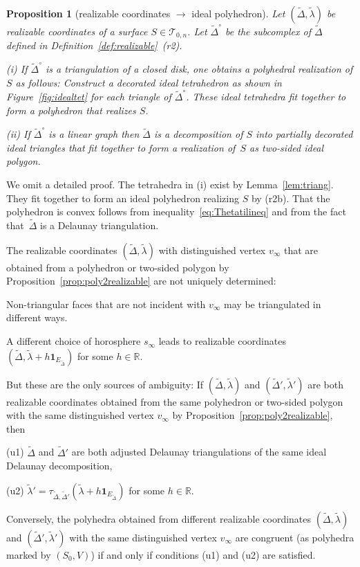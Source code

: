 \documentclass[a4paper, 11pt]{article}
\newcommand{\R}{\mathbb{R}}
\newcommand{\Teich}{\mathcal{T}}
\newcommand{\Deltil}{\widetilde{\Delta}}
\newcommand{\Deltilo}{\Deltil^{\circ}}
\newcommand{\lamtil}{\tilde{\lambda}}
\theoremstyle{plain}
\newtheorem{proposition}[theorem]{Proposition}
\theoremstyle{definition}
\begin{document}
\begin{proposition}[realizable coordinates $\rightarrow$ ideal polyhedron]
  \label{prop:realizable2poly}
  Let $(\Deltil,\lamtil)$ be realizable coordinates of a surface
  $S\in\Teich_{0,n}$. Let $\Deltilo$ be the subcomplex of $\Deltil$
  defined in Definition~\ref{def:realizable}~(r2).
  
  (i) If $\Deltilo$ is a triangulation of a closed disk, one obtains a
  polyhedral realization of $S$ as follows: Construct a decorated
  ideal tetrahedron as shown in Figure~\ref{fig:idealtet} for each
  triangle of $\Deltilo$. These ideal tetrahedra fit
  together to form a polyhedron that realizes $S$.

  (ii) If $\Deltilo$ is a linear graph then $\Deltil$ is a
  decomposition of $S$ into partially decorated ideal triangles that
  fit together to form a realization of~$S$ as two-sided ideal
  polygon.
\end{proposition}

We omit a detailed proof. The tetrahedra in (i) exist by
Lemma~\ref{lem:triang}. They fit together to form an ideal polyhedron
realizing $S$ by (r2b). That the polyhedron is convex follows from
inequality~\eqref{eq:Thetatilineq} and from the fact that~$\Deltil$ is
a Delaunay triangulation.

The realizable coordinates $(\Deltil,\lamtil)$ with distinguished
vertex $v_{\infty}$ that are obtained from a polyhedron or two-sided
polygon by Proposition~\ref{prop:poly2realizable} are not uniquely
determined:
\begin{compactitem}
\item Non-triangular faces that are not incident with
  $v_{\infty}$ may be triangulated in different ways. 
\item A different choice of horosphere $s_{\infty}$ leads to
  realizable coordinates
  $(\Deltil,\lamtil+h\mathbf{1}_{E_{\Deltil}})$ for some $h\in\R$.
\end{compactitem}
But these are the only sources of ambiguity: If $(\Deltil,\lamtil)$
and $(\Deltil',\lamtil')$ are both realizable coordinates obtained
from the same polyhedron or two-sided polygon with the same
distinguished vertex $v_{\infty}$ by
Proposition~\ref{prop:poly2realizable}, then
\begin{compactitem}[(u2)]
\item[(u1)] $\Deltil$ and $\Deltil'$ are both adjusted Delaunay
  triangulations of the same ideal Delaunay decomposition,
\item[(u2)]
  $\lamtil'=\tau_{\Deltil,\Deltil'}(\lamtil+h\mathbf{1}_{E_{\Deltil}})$
  for some $h\in\R$.
\end{compactitem}
Conversely, the polyhedra obtained from different realizable
coordinates $(\Deltil,\lamtil)$ and $(\Deltil',\lamtil')$ with the
same distinguished vertex $v_{\infty}$ are congruent (as polyhedra
marked by $(S_{0},V)$) if and only if conditions (u1) and (u2) are
satisfied.
\end{document}
